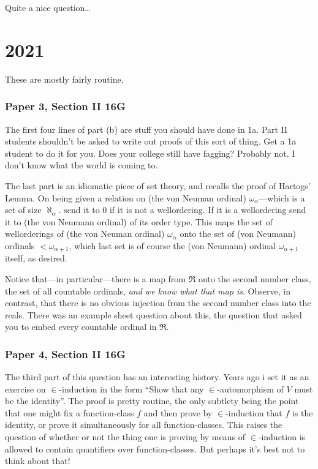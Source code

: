 \documentclass{book}
\begin{document}
  \medskip

  Quite a nice question\ldots


  \chapter{2021}

  These are mostly fairly routine.
  
  \subsection*{Paper 3, Section II 16G}

  The first four lines of part (b) are stuff you should have done in
  1a.  Part II students shouldn't be asked to write out proofs of
  this sort of thing.  Get a 1a student to do it for you.  Does your
  college still have fagging? Probably not. I don't know what the
  world is coming to.

  \smallskip
  
  The last part is an idiomatic piece of set theory, and recalls the
  proof of Hartogs' Lemma.  On being given a relation on (the von Neuman
  ordinal) $\omega_\alpha$---which is a set of size $\aleph_\alpha$.
  send it to $0$ if it is not a wellordering.  If it is a wellordering
  send it to (the von Neumann ordinal) of its order type.  This maps
  the set of wellorderings of (the von Neuman ordinal) $\omega_\alpha$
  onto the set of (von Neumann) ordinals $< \omega_{\alpha+1}$, which
  last set is of course the (von Neumann) ordinal $\omega_{\alpha+1}$
  itself, as desired.

  Notice that---in particular---there is a map from $\Re$ onto the
  second number class, the set of all countable ordinals, {\sl and we
    know what that map is}.  Observe, in contrast, that there is no
  obvious injection from the second number class into the reals.
  There was an example sheet question about this, the question that
  asked you to embed every countable ordinal in $\Re$.


\subsection*{Paper 4, Section II 16G}

The third part of this question has an interesting history.  Years ago
i set it as an exercise on $\in$-induction in the form ``Show that any
$\in$-automorphism of $V$ must be the identity''.  The proof is pretty
routine, the only subtlety being the point that one might fix a
function-class $f$ and then prove by $\in$-induction that $f$ is the
identity, or prove it simultaneously for all function-classes.  This
raises the question of whether or not the thing one is proving by
means of $\in$-induction is allowed to contain quantifiers over
function-classes.  But perhaps it's best not to think about that!
\end{document}

